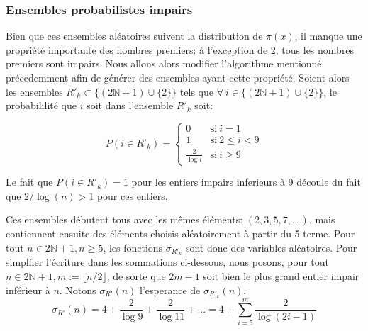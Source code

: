 \documentclass[../main.tex]{report}
\begin{document}
    \label{sec:odd_prob}
\subsubsection{Ensembles probabilistes impairs}
Bien que ces ensembles aléatoires suivent la distribution de $\pi(x)$, il manque une propriété importante des nombres premiers: à l'exception de $2$, tous les nombres premiers sont impairs.
Nous allons alors modifier l'algorithme mentionné précedemment afin de générer des ensembles ayant cette propriété. 
Soient alors les ensembles $R'_{k} \subset \{(2\mathbb{N}+1) \cup \{2\}\}$ tels que $\forall~i \in \{(2\mathbb{N}+1) \cup \{2\}\}$, le probabililité que $i$ soit dans l'ensemble $R'_{k}$ soit:

\[
P(i \in R'_{k}) = 
\left\{ 
    \begin{array}{cl}
         0 & \mbox{si}~i = 1 \\
         1 & \mbox{si}~ 2 \leq i < 9 \\
         \frac{2}{\log i} & \mbox{si}~i \geq 9
    \end{array}
\right.
\]

Le fait que $P(i \in R'_{k}) = 1$ pour les entiers impairs inferieurs à 9 découle du fait que $2/\log(n) > 1$ pour ces entiers.

Ces ensembles débutent tous avec les mêmes éléments: $ (2,3,5,7,...) $, mais contiennent ensuite des éléments choisis aléatoirement à partir du 5 terme. 
Pour tout $n \in 2\mathbb{N}+1, n\geq 5$, les fonctions $\sigma_{R'_k}$ sont donc des variables aléatoires. Pour simplfier l'écriture dans les sommations ci-dessous, nous posons, pour tout $n \in 2\mathbb{N} + 1, m:= \lfloor n/2 \rfloor$, de sorte que $2m-1$ soit bien le plus grand entier impair inférieur à $n$.
Notons $\sigma_{R'}(n)$ l'esperance de $\sigma_{R'_k}(n)$.
\[
\sigma_{R'}(n)
= 4 + \frac{2}{\log 9} + \frac{2}{\log 11} + ...
= 4 + \sum_{i=5}^m \frac{2}{\log (2i-1)}
\]

%
\end{document}
